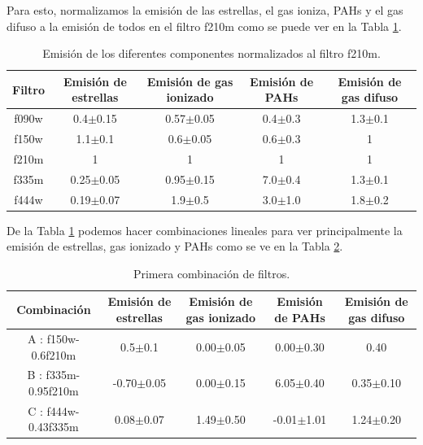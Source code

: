 \documentclass{book}
\begin{document}
Para esto, normalizamos la emisión de las estrellas, el gas ioniza, PAHs y el gas difuso a la emisión de todos en el filtro f210m como se puede ver en la Tabla \ref{tab:emision en filtros}.
\begin{table}[htb]
    \centering
    \begin{tabular}{c c c c c}
        \toprule
        Filtro & Emisión de estrellas & Emisión de gas ionizado & Emisión de PAHs & Emisión de gas difuso \\
        \midrule
         f090w & 0.4$\pm$0.15 & 0.57$\pm$0.05 & 0.4$\pm$0.3 & 1.3$\pm$0.1 \\
         f150w & 1.1$\pm$0.1 & 0.6$\pm$0.05 & 0.6$\pm$0.3 & 1 \\
         f210m & 1 & 1 & 1 & 1 \\
         f335m & 0.25$\pm$0.05 & 0.95$\pm$0.15 & 7.0$\pm$0.4 & 1.3$\pm$0.1 \\
         f444w & 0.19$\pm$0.07 & 1.9$\pm$0.5 & 3.0$\pm$1.0 & 1.8$\pm$0.2 \\
         \bottomrule
    \end{tabular}
    \caption{Emisión de los diferentes componentes normalizados al filtro f210m.}
    \label{tab:emision en filtros}
\end{table}

De la Tabla \ref{tab:emision en filtros} podemos hacer combinaciones lineales para ver principalmente la emisión de estrellas, gas ionizado y PAHs como se ve en la Tabla \ref{tab:emision en filtros_primera combinacion}. 
\begin{table}[htb]
    \centering
    \begin{tabular}{c c c c c}
        \toprule
        Combinación & Emisión de estrellas & Emisión de gas ionizado & Emisión de PAHs & Emisión de gas difuso \\
        \midrule
         A : f150w-0.6f210m & 0.5$\pm$0.1 & 0.00$\pm$0.05 & 0.00$\pm$0.30 & 0.40\\
         B : f335m-0.95f210m & -0.70$\pm$0.05 & 0.00$\pm$0.15 & 6.05$\pm$0.40 & 0.35$\pm$0.10 \\
         C : f444w-0.43f335m & 0.08$\pm$0.07 & 1.49$\pm$0.50 & -0.01$\pm$1.01 & 1.24$\pm$0.20 \\
         \bottomrule
    \end{tabular}
    \caption{Primera combinación de filtros.}
    \label{tab:emision en filtros_primera combinacion}
\end{table}
\end{document}
